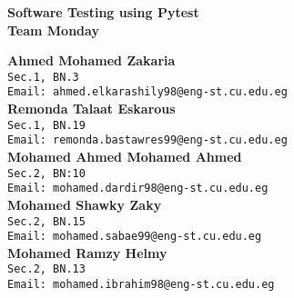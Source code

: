 \documentclass[a4paper,12pt]{article}
\begin{document}
\begin{center}
{ \huge \bfseries Software Testing using Pytest}\\[0.5cm] %
{ \Large \bfseries Team Monday}\\[0.5cm]



\begin{minipage}{0.8\textwidth}
\begin{center} 

\textbf{Ahmed Mohamed Zakaria} \\
\texttt{Sec.1, BN.3} \\
\texttt{Email: ahmed.elkarashily98@eng-st.cu.edu.eg} \\[0.3cm]

\textbf{Remonda Talaat Eskarous} \\
\texttt{Sec.1, BN.19} \\
\texttt{Email: remonda.bastawres99@eng-st.cu.edu.eg} \\[0.3cm]

\textbf{Mohamed Ahmed Mohamed Ahmed} \\
\texttt{Sec.2, BN:10} \\
\texttt{Email: mohamed.dardir98@eng-st.cu.edu.eg} \\[0.3cm]

\textbf{Mohamed Shawky Zaky} \\
\texttt{Sec.2, BN.15} \\
\texttt{Email: mohamed.sabae99@eng-st.cu.edu.eg} \\[0.3cm]

\textbf{Mohamed Ramzy Helmy} \\
\texttt{Sec.2, BN.13} \\
\texttt{Email: mohamed.ibrahim98@eng-st.cu.edu.eg} \\[0.3cm]

\end{center}
\end{minipage}

\end{center}

\begin{scriptsize}
\tableofcontents
\end{scriptsize}
\end{document}
